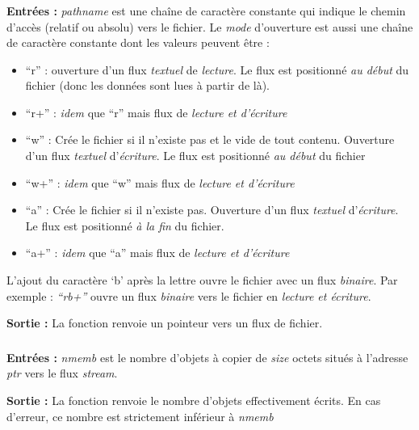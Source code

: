 \documentclass[../../../main.tex]{subfiles}
\begin{document}
\subsubsection{}
\textbf{Entrées :}\newline
\textit{pathname} est une chaîne de caractère constante qui indique le chemin d'accès (relatif ou absolu) vers le fichier. \newline
Le \textit{mode} d'ouverture est aussi une chaîne de caractère constante dont les valeurs peuvent être :
\begin{itemize}
	\item ``r'' : ouverture d'un flux \textit{textuel} de \textit{lecture}. Le flux est positionné \textit{au début} du fichier (donc les données sont lues à partir de là).
	\item ``r+'' : \textit{idem} que ``r'' mais flux de \textit{lecture et d'écriture}
	\item ``w'' : Crée le fichier si il n'existe pas et le vide de tout contenu. Ouverture d'un flux \textit{textuel} d'\textit{écriture}. Le flux est positionné \textit{au début} du fichier
	\item ``w+'' : \textit{idem} que ``w'' mais flux de \textit{lecture et d'écriture}
	\item ``a'' : Crée le fichier si il n'existe pas. Ouverture d'un flux \textit{textuel} d'\textit{écriture}. Le flux est positionné \textit{à la fin} du fichier.
	\item ``a+'' : \textit{idem} que ``a'' mais flux de \textit{lecture et d'écriture}
\end{itemize}
L'ajout du caractère `b' après la lettre ouvre le fichier avec un flux \textit{binaire}. Par exemple : \textit{``rb+''} ouvre un flux \textit{binaire} vers le fichier en \textit{lecture et écriture}.
 
\textbf{Sortie :} La fonction renvoie un pointeur vers un flux de fichier.
\subsubsection{}
\textbf{Entrées :}\newline
\textit{nmemb} est le nombre d'objets à copier de \textit{size} octets situés à l'adresse \textit{ptr} vers le flux \textit{stream}.
 
\textbf{Sortie :} La fonction renvoie le nombre d'objets effectivement écrits. En cas d'erreur, ce nombre est strictement inférieur à \textit{nmemb}
\end{document}
